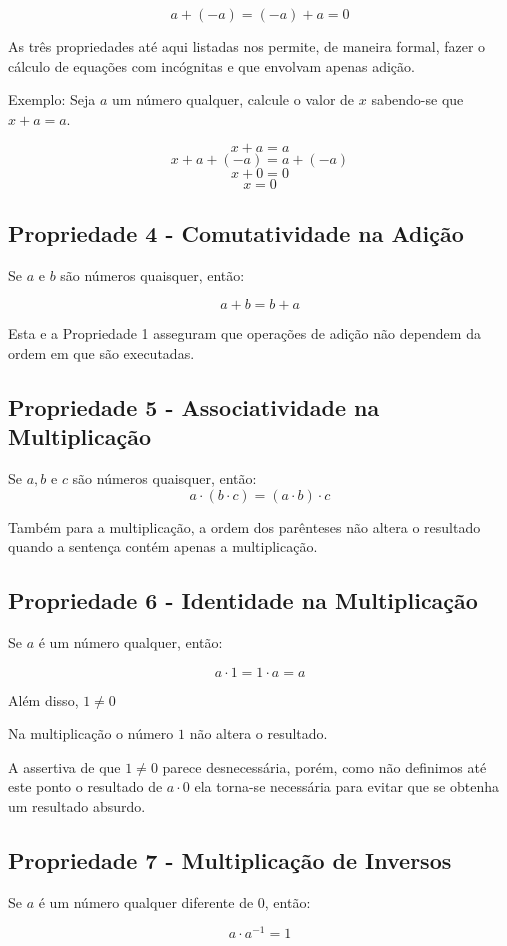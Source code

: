 \documentclass[
    12pt, %
    openright,
    twoside, %
    a4paper, %
    article,
    english,brazil %
]{abntex2}
\begin{document}
$$a+(-a)=(-a)+a=0$$

As três propriedades até aqui listadas nos permite, de maneira formal, fazer o cálculo de equações com incógnitas e que envolvam apenas adição. 

Exemplo: Seja $a$ um número qualquer, calcule o valor de $x$ sabendo-se que $x+a=a$. 

$$x+a=a$$
$$x+a+(-a)=a+(-a)$$
$$x+0=0$$
$$x=0$$

\subsection{Propriedade 4 - Comutatividade na Adição}
Se $a$ e $b$ são números quaisquer, então: 

$$a+b=b+a$$

Esta e a Propriedade 1 asseguram que operações de adição não dependem da ordem em que são executadas.

\subsection{Propriedade 5 - Associatividade na Multiplicação}
Se $a,b$ e $c$ são números quaisquer, então: 
$$ a \cdot (b \cdot c)=(a \cdot b)\cdot c $$

Também para a multiplicação, a ordem dos parênteses não altera o resultado quando a sentença contém apenas a multiplicação.

\subsection{Propriedade 6 - Identidade na Multiplicação}
Se $a$ é um número qualquer, então: 

$$a \cdot 1=1 \cdot a=a$$

Além disso, $1 \neq 0$

Na multiplicação o número $1$ não altera o resultado.

A assertiva de que $1 \neq 0$ parece desnecessária, porém, como não definimos até este ponto o resultado de $a \cdot 0$ ela torna-se necessária para evitar que se obtenha um resultado absurdo.

\subsection{Propriedade 7 - Multiplicação de Inversos}
Se $a$ é um número qualquer diferente de $0$, então: 

$$a \cdot a^{-1}=1$$
\end{document}
